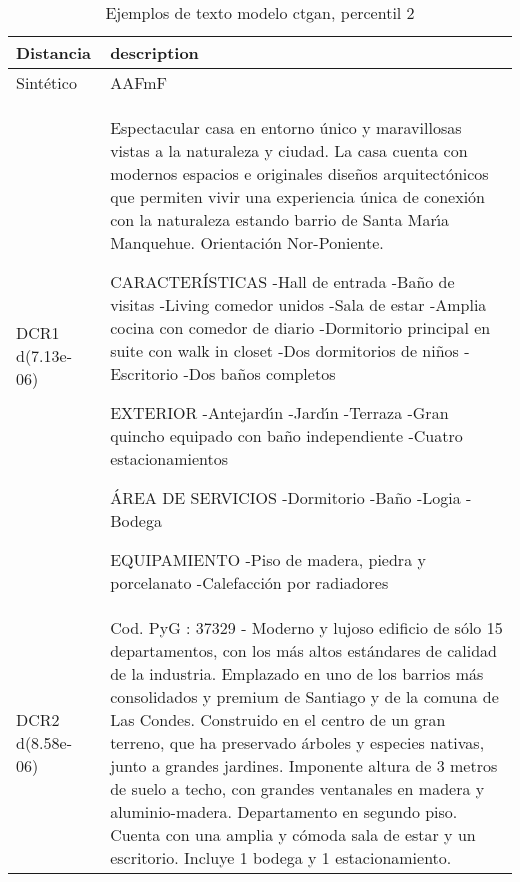 \begin{table}[H]
\centering
\fontsize{10}{14}\selectfont
\caption{Ejemplos de texto modelo ctgan, percentil 2}
\label{table-example-economicos-a-1-ctgan-2p-text}
\begin{tabular}{|l|m{35em}|}
\hline
\rowcolor[gray]{0.8}
Distancia & description \\
\hline Sintético & AAFmF \\
\hline DCR1 d(7.13e-06) & Espectacular casa en entorno \'unico y maravillosas vistas a la naturaleza y ciudad. 
La casa cuenta con modernos espacios e originales dise\~nos arquitect\'onicos que permiten vivir una experiencia \'unica de conexi\'on con la naturaleza estando barrio de Santa Mar{\'\i}a Manquehue. 
Orientaci\'on Nor-Poniente.

CARACTER\'ISTICAS
-Hall de entrada 
-Ba\~no de visitas 
-Living comedor unidos 
-Sala de estar
-Amplia cocina con comedor de diario 
-Dormitorio principal en suite con walk in closet 
-Dos dormitorios de ni\~nos 
-Escritorio 
-Dos ba\~nos completos 

EXTERIOR 
-Antejard{\'\i}n 
-Jard{\'\i}n 
-Terraza 
-Gran quincho equipado con ba\~no independiente
-Cuatro estacionamientos 

\'AREA DE SERVICIOS 
-Dormitorio 
-Ba\~no 
-Logia 
-Bodega 

EQUIPAMIENTO 
-Piso de madera, piedra y porcelanato 
-Calefacci\'on por radiadores \\
\hline DCR2 d(8.58e-06) & Cod. PyG : 37329 - Moderno y lujoso edificio de s\'olo 15 departamentos, con los m\'as altos est\'andares de calidad de la industria. Emplazado en uno de los barrios m\'as consolidados y premium de Santiago y de la comuna de Las Condes. Construido en el centro de un gran terreno, que ha preservado \'arboles y especies nativas, junto a grandes jardines. Imponente altura de 3 metros de suelo a techo, con grandes ventanales en madera y aluminio-madera. Departamento en segundo piso. Cuenta con una amplia y c\'omoda sala de estar y un escritorio. Incluye 1 bodega y 1 estacionamiento. \\
\hline
\end{tabular}
\end{table}
